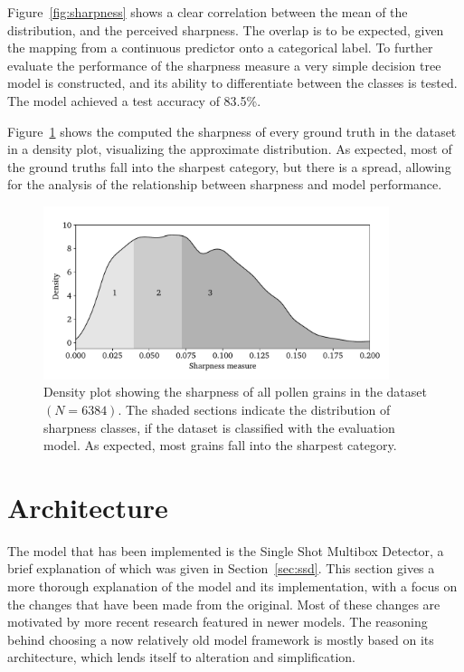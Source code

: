 Figure~\ref{fig:sharpness} shows a clear correlation between the mean of the distribution, and the perceived sharpness.
The overlap is to be expected, given the mapping from a continuous predictor onto a categorical label.
To further evaluate the performance of the sharpness measure a very simple decision tree model is constructed, and its ability to differentiate between the classes is tested.
The model achieved a test accuracy of 83.5\%.

Figure~\ref{fig:sharpness-all} shows the computed the sharpness of every ground truth in the dataset in a density plot, visualizing the approximate distribution.
As expected, most of the ground truths fall into the sharpest category, but there is a spread, allowing for the analysis of the relationship between sharpness and model performance.

\begin{figure}[htbp]
  \centering
  \includegraphics[width=0.9\textwidth]{figs/method/sharpness_all.pdf}
  \caption[Distribution of sharpness across entire dataset]{Density plot showing the sharpness of all pollen grains in the dataset \((N=6384)\).
The shaded sections indicate the distribution of sharpness classes, if the dataset is classified with the evaluation model.
As expected, most grains fall into the sharpest category.}\label{fig:sharpness-all}
\end{figure}

\section{Architecture}\label{sec:method-arch}

The model that has been implemented is the Single Shot Multibox Detector, a brief explanation of which was given in Section~\ref{sec:ssd}.
This section gives a more thorough explanation of the model and its implementation, with a focus on the changes that have been made from the original.
Most of these changes are motivated by more recent research featured in newer models.
The reasoning behind choosing a now relatively old model framework is mostly based on its architecture, which lends itself to alteration and simplification.


